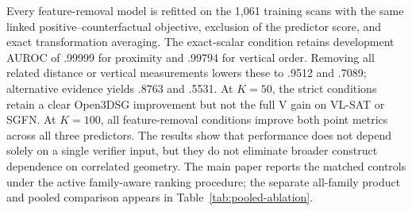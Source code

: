 Every feature-removal model is refitted on the 1,061 training scans with the same
linked positive--counterfactual objective, exclusion of the predictor score,
and exact transformation averaging.
The exact-scalar condition retains development AUROC of .99999 for proximity
and .99794 for vertical order. Removing all related distance or vertical measurements lowers these
to .9512 and .7089; alternative evidence yields .8763 and .5531. At $K=50$,
the strict conditions retain a clear Open3DSG improvement but not the full V
gain on VL-SAT or SGFN. At $K=100$, all feature-removal conditions improve both
point metrics across all three predictors. The results show that performance
does not depend solely on a single verifier input, but they do not eliminate
broader construct dependence on correlated geometry. The main paper reports
the matched controls under the active family-aware ranking procedure; the
separate all-family product and pooled comparison appears in
Table~\ref{tab:pooled-ablation}.
